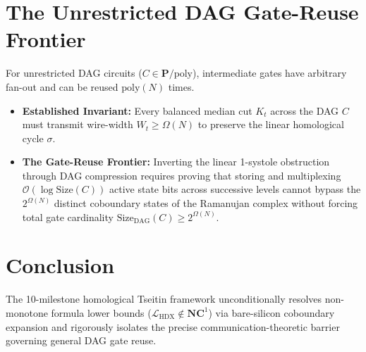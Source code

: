 \documentclass[11pt,a4paper]{article}
\theoremstyle{definition}
\newcommand{\Size}{\mathrm{Size}}
\begin{document}
\section{The Unrestricted DAG Gate-Reuse Frontier}
For unrestricted DAG circuits ($C \in \mathbf{P}/\mathrm{poly}$), intermediate gates have arbitrary fan-out and can be reused $\mathrm{poly}(N)$ times.
\begin{itemize}[leftmargin=*]
\item \textbf{Established Invariant:} Every balanced median cut $K_t$ across the DAG $C$ must transmit wire-width $W_t \ge \Omega(N)$ to preserve the linear homological cycle $\sigma$.
\item \textbf{The Gate-Reuse Frontier:} Inverting the linear 1-systole obstruction through DAG compression requires proving that storing and multiplexing $\mathcal{O}(\log \Size(C))$ active state bits across successive levels cannot bypass the $2^{\Omega(N)}$ distinct coboundary states of the Ramanujan complex without forcing total gate cardinality $\Size_{\mathrm{DAG}}(C) \ge 2^{\Omega(N)}$.
\end{itemize}

\section{Conclusion}
The 10-milestone homological Tseitin framework unconditionally resolves non-monotone formula lower bounds ($\mathcal{L}_{\mathrm{HDX}} \notin \mathbf{NC}^1$) via bare-silicon coboundary expansion and rigorously isolates the precise communication-theoretic barrier governing general DAG gate reuse.
\end{document}
